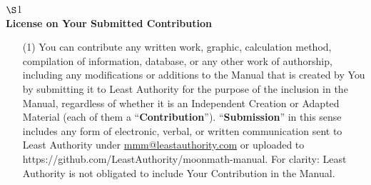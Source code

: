 \begin{center}
$\S$1\\\bfseries
License on Your Submitted Contribution
\end{center}

\begin{itemize}
\item[(1)] You can contribute any written work, graphic, calculation method, compilation of information, database, or any other work of authorship, including any modifications or additions to the Manual that is created by You by submitting it to Least Authority for the purpose of the inclusion in the Manual, regardless of whether it is an Independent Creation or Adapted Material (each of them a ``\textbf{Contribution}''). ``\textbf{Submission}'' in this sense includes any form of electronic, verbal, or written communication sent to Least Authority under \href{mailto:mmm@leastauthority.com}{mmm@leastauthority.com} or uploaded to https://github.com/LeastAuthority/moonmath-manual. For clarity: Least Authority is not obligated to include Your Contribution in the Manual.


\end{itemize}
